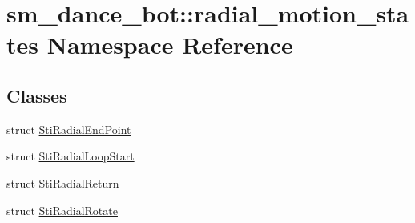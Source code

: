\hypertarget{namespacesm__dance__bot_1_1radial__motion__states}{}\section{sm\+\_\+dance\+\_\+bot\+:\+:radial\+\_\+motion\+\_\+states Namespace Reference}
\label{namespacesm__dance__bot_1_1radial__motion__states}
\subsection*{Classes}
\begin{DoxyCompactItemize}
\item 
struct \hyperlink{structsm__dance__bot_1_1radial__motion__states_1_1StiRadialEndPoint}{Sti\+Radial\+End\+Point}
\item 
struct \hyperlink{structsm__dance__bot_1_1radial__motion__states_1_1StiRadialLoopStart}{Sti\+Radial\+Loop\+Start}
\item 
struct \hyperlink{structsm__dance__bot_1_1radial__motion__states_1_1StiRadialReturn}{Sti\+Radial\+Return}
\item 
struct \hyperlink{structsm__dance__bot_1_1radial__motion__states_1_1StiRadialRotate}{Sti\+Radial\+Rotate}
\end{DoxyCompactItemize}
